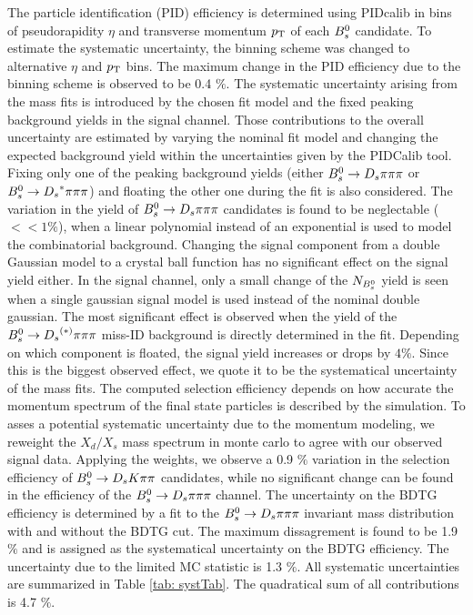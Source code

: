 The particle identification (PID) efficiency is determined using PIDcalib in bins of pseudorapidity $\eta$ and transverse momentum $\mbox{$p_{\mathrm{ T}}$}$ of each ${{B}^0_{s}}$ candidate. 
To estimate the systematic uncertainty, the binning scheme was changed to alternative $\eta$ and $\mbox{$p_{\mathrm{ T}}$}$ bins. The maximum change in the PID efficiency due to the binning scheme is observed to be 0.4 $\%$. \newline
The systematic uncertainty arising from the mass fits is introduced by the chosen fit model and the fixed peaking background yields in the signal channel. 
Those contributions to the overall uncertainty are estimated by varying the nominal fit model and changing the expected background yield within the uncertainties given by the PIDCalib tool. 
Fixing only one of the peaking background yields (either ${{B}^0_{s}}\rightarrow{\ensuremath{{D}_{s}}}{\ensuremath{\pi}}{\ensuremath{\pi}}{\ensuremath{\pi}}$ or ${{B}^0_{s}}\rightarrow{\ensuremath{{D}_{s}}}^{*}{\pi}{\pi}{\pi}$) and floating the other one during the fit is also considered.
The variation in the yield of ${{B}^0_{s}}\rightarrow{\ensuremath{{D}_{s}}}{\ensuremath{\pi}}{\ensuremath{\pi}}{\ensuremath{\pi}}$ candidates is found to be neglectable ($<< 1 \%$), when a linear polynomial instead of an exponential is used to model the combinatorial background. 
Changing the signal component from a double Gaussian model to a crystal ball function has no significant effect on the signal yield either. 
In the signal channel, only a small change of the $N_{{{B}^0_{s}}}$ yield is seen when a single gaussian signal model is used instead of the nominal double gaussian. 
The most significant effect is observed when the yield of the ${{B}^0_{s}}\rightarrow{\ensuremath{{D}_{s}}}^{(*)}{\pi}{\pi}{\pi}$ miss-ID background is directly determined in the fit. 
Depending on which component is floated, the signal yield increases or drops by $4 \%$. Since this is the biggest observed effect, we quote it to be the systematical uncertainty of the mass fits. \newline
The computed selection efficiency depends on how accurate the momentum spectrum of the final state particles is described by the simulation. 
To asses a potential systematic uncertainty due to the momentum modeling, we reweight the $X_{d}/X_{s}$ mass spectrum in monte carlo to agree with our observed signal data. 
Applying the weights, we observe a 0.9 $\%$ variation in the selection efficiency of ${{B}^0_{s}}\rightarrow{\ensuremath{{D}_{s}}}{\ensuremath{K}}{\ensuremath{\pi}}{\ensuremath{\pi}}$ candidates, while no significant change can be found in the efficiency of the 
${{B}^0_{s}}\rightarrow{\ensuremath{{D}_{s}}}{\ensuremath{\pi}}{\ensuremath{\pi}}{\ensuremath{\pi}}$ channel. \newline   
The uncertainty on the BDTG efficiency is determined by a fit to the ${{B}^0_{s}}\rightarrow{\ensuremath{{D}_{s}}}{\ensuremath{\pi}}{\ensuremath{\pi}}{\ensuremath{\pi}}$ invariant mass distribution with and without the BDTG cut. 
The maximum dissagrement is found to be 1.9 $\%$ and is assigned as the systematical uncertainty on the BDTG efficiency. \newline
The uncertainty due to the limited MC statistic is 1.3 $\%$. \newline
All systematic uncertainties are summarized in Table \ref{tab: systTab}. The quadratical sum of all contributions is 4.7 $\%$.  

